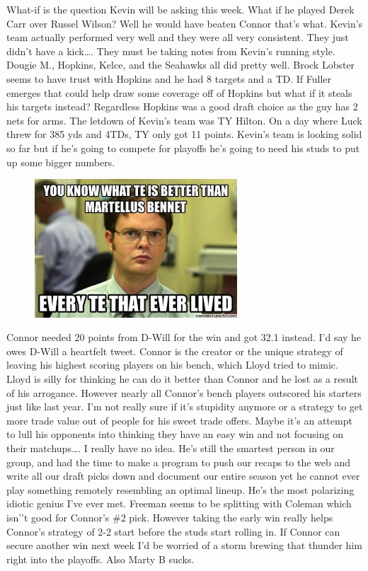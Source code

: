 \documentclass[11pt,letterpaper]{article}
\begin{document}
\newpage
{}
\par\noindent What-if is the question Kevin will be asking this week. What if he played Derek Carr over Russel Wilson? Well he would have beaten Connor that's what. Kevin's team actually performed very well and they were all very consistent. They just didn't have a kick…. They must be taking notes from Kevin's running style. Dougie M., Hopkins, Kelce, and the Seahawks all did pretty well. Brock Lobster seems to have trust with Hopkins and he had 8 targets and a TD. If Fuller emerges that could help draw some coverage off of Hopkins but what if it steals his targets instead? Regardless Hopkins was a good draft choice as the guy has 2 nets for arms. The letdown of Kevin's team was TY Hilton. On a day where Luck threw for 385 yds and 4TDs, TY only got 11 points. Kevin's team is looking solid so far but if he's going to compete for playoffs he's going to need his studs to put up some bigger numbers.
\begin{figure}
\centering
\includegraphics[width=0.675\textwidth]{week1-martyB.png}
\label{fig:week1-martyB}
\end{figure} 
\bigskip
\par\noindent Connor needed 20 points from D-Will for the win and got 32.1 instead. I'd say he owes D-Will a heartfelt tweet. Connor is the creator or the unique strategy of leaving his highest scoring players on his bench, which Lloyd tried to mimic. Lloyd is silly for thinking he can do it better than Connor and he lost as a result of his arrogance. However nearly all Connor's bench players outscored his starters just like last year. I'm not really sure if it's stupidity anymore or a strategy to get more trade value out of people for his sweet trade offers. Maybe it's an attempt to lull his opponents into thinking they have an easy win and not focusing on their matchups…. I really have no idea. He's still the smartest person in our group, and had the time to make a program to push our recaps to the web and write all our draft picks down and document our entire season yet he cannot ever play something remotely resembling an optimal lineup. He's the most polarizing idiotic genius I've ever met. Freeman seems to be splitting with Coleman which isn’'t good for Connor's \#2 pick. However taking the early win really helps Connor's strategy of 2-2 start before the studs start rolling in. If Connor can secure another win next week I'd be worried of a storm brewing that thunder him right into the playoffs. Also Marty B sucks.
\end{document}
